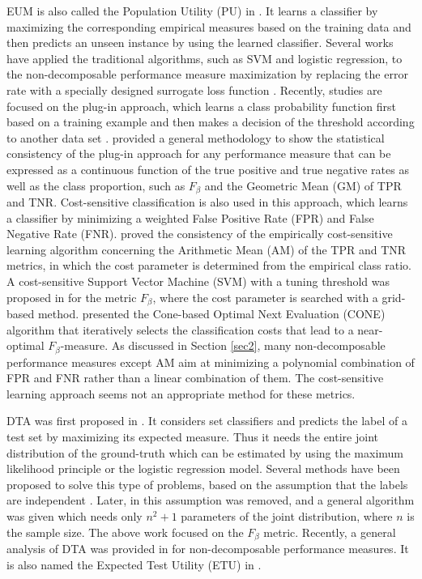 \documentclass[15pt]{article}
\begin{document}
EUM is also called the Population Utility (PU) in \cite{Dembczynsk2017}.
It learns a classifier by maximizing the corresponding empirical measures based on the training data
and then predicts an unseen instance by using the learned classifier.
Several works have applied the traditional algorithms, such as SVM and logistic regression, to the
non-decomposable performance measure maximization by replacing the error rate with a specially designed
surrogate loss function \cite{Musicant2003,Jansche2005,Joachims2005,Chinta2013}.
Recently, studies are focused on the plug-in approach, which learns a class probability function first
based on a training example and then makes a decision of the threshold according to another data
set \cite{Menon2013,Ye2012,Kotlowski2017}.
\cite{Narasimhan2014} provided a general methodology to show the statistical consistency of the plug-in
approach for any performance measure that can be expressed as a continuous function of the true positive
and true negative rates as well as the class proportion, such as $F_\beta$ and the Geometric Mean (GM) of
TPR and TNR. Cost-sensitive classification is also used in this approach, which learns a classifier by
minimizing a weighted False Positive Rate (FPR) and False Negative Rate (FNR).
\cite{Menon2013} proved the consistency of the empirically cost-sensitive learning algorithm concerning
the Arithmetic Mean (AM) of the TPR and TNR metrics, in which the cost parameter is determined from the
empirical class ratio.
A cost-sensitive Support Vector Machine (SVM) with a tuning threshold was proposed in \cite{Parambath2014} 
for the metric $F_\beta$, where the cost parameter is searched with a grid-based method.
\cite{Bascol2019} presented the Cone-based Optimal Next Evaluation (CONE) algorithm that iteratively
selects the classification costs that lead to a near-optimal $F_\beta$-measure.
As discussed in Section \ref{sec2}, many non-decomposable performance measures except AM aim at minimizing
a polynomial combination of FPR and FNR rather than a linear combination of them.
The cost-sensitive learning approach seems not an appropriate method for these metrics.

DTA was first proposed in \cite{Lewis1995}.
It considers set classifiers and predicts the label of a test set by maximizing its expected measure.
Thus it needs the entire joint distribution of the ground-truth which can be estimated by
using the maximum likelihood principle or the logistic regression model.
Several methods have been proposed to solve this type of problems, based on the assumption that the labels
are independent \cite{Lewis1995,Jansche2007,Ye2012}.
Later, in \cite{Dembczynsk2011,Waegeman2014} this assumption was removed, and a general algorithm was given
which needs only $n^2+1$ parameters of the joint distribution, where $n$ is the sample size.
The above work focused on the $F_\beta$ metric. Recently, a general analysis of DTA was provided
in \cite{Natarajan2015} for non-decomposable performance measures.
It is also named the Expected Test Utility (ETU) in \cite{Dembczynsk2017}.
\end{document}

